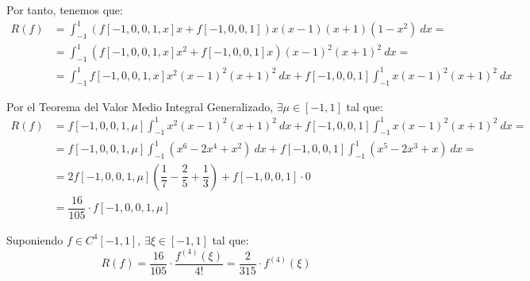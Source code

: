 \documentclass[12pt]{article}
\begin{document}
{\begin{ejercicio}
\begin{enumerate}
            Por tanto, tenemos que:
            \begin{align*}
                R(f) &= \int_{-1}^1\left(f[-1, 0, 0, 1, x]x + f[-1, 0, 0, 1]\right)x(x-1)(x+1)(1-x^2)\ dx
                =\\&= \int_{-1}^1\left(f[-1, 0, 0, 1, x]x^2+f[-1, 0, 0, 1]x\right)(x-1)^2(x+1)^2\ dx
                =\\&= \int_{-1}^1f[-1, 0, 0, 1, x]x^2(x-1)^2(x+1)^2\ dx + f[-1, 0, 0, 1]\int_{-1}^1x(x-1)^2(x+1)^2\ dx
            \end{align*}

            Por el Teorema del Valor Medio Integral Generalizado, $\exists \mu\in [-1,1]$ tal que:
            \begin{align*}
                R(f) &= f[-1, 0, 0, 1, \mu]\int_{-1}^1x^2(x-1)^2(x+1)^2\ dx + f[-1, 0, 0, 1]\int_{-1}^1x(x-1)^2(x+1)^2\ dx
                =\\&= f[-1, 0, 0, 1, \mu]\int_{-1}^1(x^6-2x^4+x^2)\ dx + f[-1, 0, 0, 1]\int_{-1}^1(x^5-2x^3+x)\ dx
                =\\&= 2f[-1, 0, 0, 1, \mu]\left(\dfrac{1}{7}-\dfrac{2}{5}+\dfrac{1}{3}\right) + f[-1, 0, 0, 1]\cdot 0
                \\&= \dfrac{16}{105}\cdot f[-1, 0, 0, 1, \mu]
            \end{align*}

            Suponiendo $f\in C^4[-1,1]$, $\exists \xi\in [-1,1]$ tal que:
            \begin{equation*}
                R(f) = \dfrac{16}{105}\cdot \dfrac{f^{(4)}(\xi)}{4!}
                = \dfrac{2}{315}\cdot f^{(4)}(\xi)
            \end{equation*}
        \end{enumerate}
    \end{ejercicio}    
    }
\end{document}
